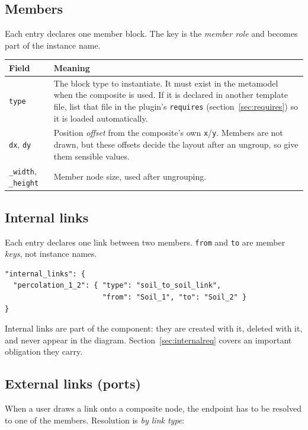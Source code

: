 \documentclass[11pt,a4paper]{article}
\newcommand{\code}[1]{\texttt{\small #1}}
\begin{document}
\subsection{Members}

Each entry declares one member block. The key is the \emph{member role} and
becomes part of the instance name.

\begin{longtable}{@{}p{}p{}@{}}
\toprule
\textbf{Field} & \textbf{Meaning}\\
\midrule
\endhead
\code{type} & The block type to instantiate. It must exist in the metamodel
when the composite is used. If it is declared in another template file, list
that file in the plugin's \code{requires} (section~\ref{sec:requires}) so it is
loaded automatically.\\
\code{dx}, \code{dy} & Position \emph{offset} from the composite's own
\code{x}/\code{y}. Members are not drawn, but these offsets decide the layout
after an ungroup, so give them sensible values.\\
\code{\_width}, \code{\_height} & Member node size, used after ungrouping.\\
\bottomrule
\end{longtable}

\subsection{Internal links}

Each entry declares one link between two members. \code{from} and \code{to} are
member \emph{keys}, not instance names.

\begin{lstlisting}
"internal_links": {
  "percolation_1_2": { "type": "soil_to_soil_link",
                       "from": "Soil_1", "to": "Soil_2" }
}
\end{lstlisting}

\noindent
Internal links are part of the component: they are created with it, deleted
with it, and never appear in the diagram. Section~\ref{sec:internalreq} covers
an important obligation they carry.

\subsection{External links (ports)}\label{sec:ports}

When a user draws a link onto a composite node, the endpoint has to be resolved
to one of the members. Resolution is \emph{by link type}:
\end{document}
